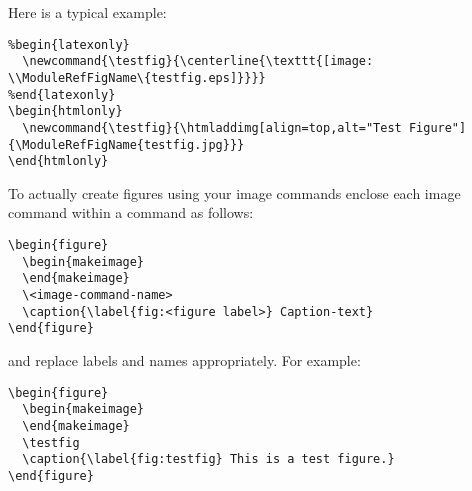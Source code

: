 \documentclass[11pt]{article}
\begin{document}
Here is a typical example:
%
\begin{verbatim}
%begin{latexonly}
  \newcommand{\testfig}{\centerline{\texttt{[image: \\ModuleRefFigName\{testfig.eps]}}}}
%end{latexonly}
\begin{htmlonly}
  \newcommand{\testfig}{\htmladdimg[align=top,alt="Test Figure"]{\ModuleRefFigName{testfig.jpg}}}
\end{htmlonly}
\end{verbatim}


\begin{rawhtml}
  <PRE>
  &#37begin{latexonly}
  \newcommand{\testfig}{\centerline{\texttt{[image: \\ModuleRefFigName\{testfig.eps]}}}}
  &#37end{latexonly}
  &#92begin{htmlonly}
  \newcommand{\testfig}{\htmladdimg[align=top,alt="Test Figure"]{\ModuleRefFigName{testfig.jpg}}}
  &#92end{htmlonly}
  </PRE>
\end{rawhtml}

To actually create figures using your image commands enclose each image
command within a  command as follows:

\begin{verbatim}
\begin{figure}
  \begin{makeimage}
  \end{makeimage}
  \<image-command-name>
  \caption{\label{fig:<figure label>} Caption-text}
\end{figure}
\end{verbatim}



and replace labels and names appropriately.  For example:

\begin{verbatim}
\begin{figure}
  \begin{makeimage}
  \end{makeimage}
  \testfig
  \caption{\label{fig:testfig} This is a test figure.}
\end{figure}
\end{verbatim}
\end{document}
